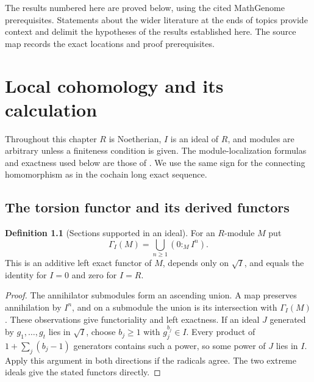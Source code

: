 \documentclass[11pt,oneside,openany]{book}
\theoremstyle{definition}
\newtheorem{definition}[theorem]{Definition}
\theoremstyle{remark}
\begin{document}
The results numbered here are proved below, using the cited MathGenome
prerequisites. Statements about the wider literature at the ends of topics
provide context and delimit the hypotheses of the results established here.
The source map records the exact locations and proof prerequisites.

\mainmatter
\chapter{Local cohomology and its calculation}
\label{ch:local-cohomology}

Throughout this chapter \(R\) is Noetherian, \(I\) is an ideal of \(R\),
and modules are arbitrary unless a finiteness condition is given.
The module-localization formulas and exactness used below are those of
\cite[ALG-05-C01-S01]{p103}. We use the same sign for the connecting
homomorphism as in the cochain long exact sequence.

\section{The torsion functor and its derived functors}

\begin{definition}[Sections supported in an ideal]\label{res:L01}
For an \(R\)-module \(M\) put
\[
 \Gamma_I(M)=\bigcup_{n\geq 1}(0:_M I^n).
\]
This is an additive left exact functor of \(M\), depends only on \(\sqrt I\),
and equals the identity for \(I=0\) and zero for \(I=R\).
\end{definition}
\begin{proof}
The annihilator submodules form an ascending union. A map preserves
annihilation by \(I^n\), and on a submodule the union is its intersection
with \(\Gamma_I(M)\). These observations give functoriality and left
exactness. If an ideal \(J\) generated by \(g_1,\ldots,g_t\) lies in
\(\sqrt I\), choose \(b_j\geq1\) with \(g_j^{b_j}\in I\). Every product
of \(1+\sum_j(b_j-1)\) generators contains such a power, so some power
of \(J\) lies in \(I\). Apply this argument in both directions if the
radicals agree. The two extreme ideals give the stated functors directly.
\end{proof}
\end{document}
